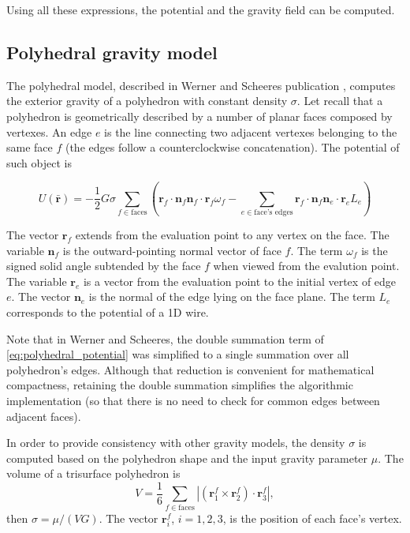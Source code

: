 Using all these expressions, the potential and the gravity field can be computed.

\subsection{Polyhedral gravity model}

The polyhedral model, described in Werner and Scheeres publication\cite{werner1996} , computes the exterior gravity of a polyhedron with constant density $\sigma$. Let recall that a polyhedron is geometrically described by a number of planar faces composed by vertexes. An edge $e$ is the line connecting two adjacent vertexes belonging to the same face $f$ (the edges follow a counterclockwise concatenation). The potential of such object is

\begin{equation}
U(\bar{\mathbf{r}})=- \frac{1}{2}G\sigma\sum_{f\in\text{faces}}\left(\mathbf{r}_f \cdot\mathbf{n}_f\mathbf{n}_f\cdot\mathbf{r}_f\omega_f-\sum_{e\in\text{face's edges}}\mathbf{r}_f\cdot\mathbf{n}_f\mathbf{n}_e\cdot\mathbf{r}_e L_e\right)\label{eq:polyhedral_potential}
\end{equation}

 The vector $\mathbf{r}_f$ extends from the evaluation point to any vertex on the face. The variable $\mathbf{n}_f$ is the outward-pointing normal vector of face $f$. The term $\omega_f$ is the signed solid angle subtended by the face $f$ when viewed from the evalution point. The variable $\mathbf{r}_e$ is a vector from the evaluation point to the initial vertex of edge $e$. The vector $\mathbf{n}_e$ is the normal of the edge lying on the face plane. The term $L_e$ corresponds to the potential of a 1D wire.

 Note that in Werner and Scheeres\cite{werner1996}, the double summation term of \eqref{eq:polyhedral_potential} was simplified to a single summation over all polyhedron's edges. Although that reduction is convenient for mathematical compactness, retaining the double summation simplifies the algorithmic implementation (so that there is no need to check for common edges between adjacent faces).

 In order to provide consistency with other gravity models, the density $\sigma$ is computed based on the polyhedron shape and the input gravity parameter $\mu$. The volume of a trisurface polyhedron is
 \begin{equation}
 V = \frac{1}{6}\sum_{f\in\text{faces}}|(\mathbf{r}^{f}_1\times\mathbf{r}^{f}_2)\cdot \mathbf{r}^{f}_3|,
 \end{equation}
then $\sigma=\mu / (VG)$. The vector $\mathbf{r}^{f}_i$, $i=1,2,3$, is the position of each face's vertex.

